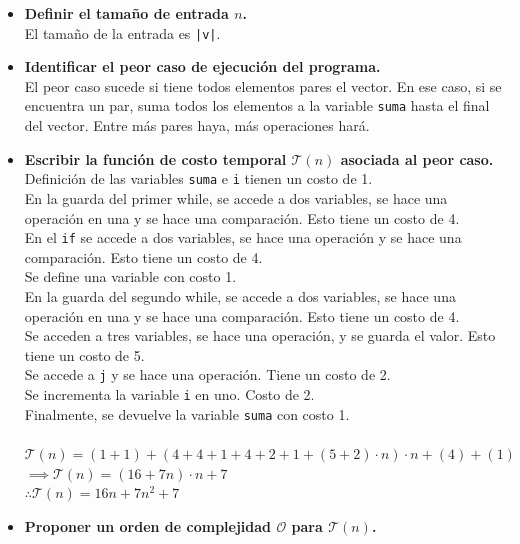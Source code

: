 \documentclass[12 pt]{article}
\begin{document}
    \begin{itemize}
        \item \textbf{Definir el tamaño de entrada $n$.} \\
            El tamaño de la entrada es \texttt{|v|}.
        \item \textbf{Identificar el peor caso de ejecución del programa.} \\
            El peor caso sucede si tiene todos elementos pares el vector. En ese caso, si se encuentra un par, suma todos los elementos a la variable \texttt{suma} hasta el final del vector. Entre más pares haya, más operaciones hará.
        \item \textbf{Escribir la función de costo temporal $\mathcal{T}(n)$ asociada al peor caso.} \\
            Definición de las variables \texttt{suma} e \texttt{i} tienen un costo de 1. \\
            En la guarda del primer while, se accede a dos variables, se hace una operación en una y se hace una comparación. Esto tiene un costo de 4. \\
                En el \texttt{if} se accede a dos variables, se hace una operación y se hace una comparación. Esto tiene un costo de 4. \\
                    Se define una variable con costo 1. \\
                    En la guarda del segundo while, se accede a dos variables, se hace una operación en una y se hace una comparación. Esto tiene un costo de 4. \\
                        Se acceden a tres variables, se hace una operación, y se guarda el valor. Esto tiene un costo de 5. \\
                        Se accede a \texttt{j} y se hace una operación. Tiene un costo de 2. \\
                    Se incrementa la variable \texttt{i} en uno. Costo de 2. \\
                    Finalmente, se devuelve la variable \texttt{suma} con costo 1. \\
            \\
            \(\mathcal{T}(n) = (1+1)+(4+4+1+4+2+1+(5+2)\cdot n)\cdot n+(4)+(1)\) \\
            \(\implies \mathcal{T}(n) = (16+7n)\cdot n+7\) \\
            \(\therefore \mathcal{T}(n) = 16n+7n^{2}+7\)
        \item \textbf{Proponer un orden de complejidad $\mathcal{O}$ para $\mathcal{T}(n)$.} \\

\end{itemize}
\end{document}
